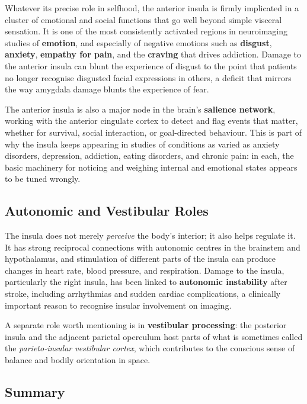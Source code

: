 \documentclass[11pt]{article}
\begin{document}
Whatever its precise role in selfhood, the anterior insula is firmly implicated in a cluster of emotional and social functions that go well beyond simple visceral sensation. It is one of the most consistently activated regions in neuroimaging studies of \textbf{emotion}, and especially of negative emotions such as \textbf{disgust}, \textbf{anxiety}, \textbf{empathy for pain}, and the \textbf{craving} that drives addiction. Damage to the anterior insula can blunt the experience of disgust to the point that patients no longer recognise disgusted facial expressions in others, a deficit that mirrors the way amygdala damage blunts the experience of fear.

The anterior insula is also a major node in the brain's \textbf{salience network}, working with the anterior cingulate cortex to detect and flag events that matter, whether for survival, social interaction, or goal-directed behaviour. This is part of why the insula keeps appearing in studies of conditions as varied as anxiety disorders, depression, addiction, eating disorders, and chronic pain: in each, the basic machinery for noticing and weighing internal and emotional states appears to be tuned wrongly.

\subsection{Autonomic and Vestibular Roles}

The insula does not merely \textit{perceive} the body's interior; it also helps regulate it. It has strong reciprocal connections with autonomic centres in the brainstem and hypothalamus, and stimulation of different parts of the insula can produce changes in heart rate, blood pressure, and respiration. Damage to the insula, particularly the right insula, has been linked to \textbf{autonomic instability} after stroke, including arrhythmias and sudden cardiac complications, a clinically important reason to recognise insular involvement on imaging.

A separate role worth mentioning is in \textbf{vestibular processing}: the posterior insula and the adjacent parietal operculum host parts of what is sometimes called the \textit{parieto-insular vestibular cortex}, which contributes to the conscious sense of balance and bodily orientation in space.

\subsection{Summary}
\end{document}

